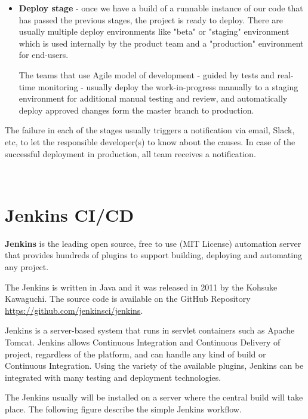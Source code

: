 \documentclass[12pt,a4paper,twoside]{article}
\begin{document}
\begin{itemize}
	\item \textbf{Deploy stage} - once we have a build of a runnable instance of our code that has passed the previous stages, the project is ready to deploy. There are usually multiple deploy environments like "beta" or "staging" environment which is used internally by the product team and a "production" environment for end-users.

The teams that use Agile model of development - guided by tests and real-time monitoring - usually deploy the work-in-progress manually to a staging environment for additional manual testing and review, and automatically deploy approved changes form the master branch to production.
\end{itemize}

The failure in each of the stages usually triggers a notification via email, Slack, etc, to let the responsible developer(s) to know about the causes. In case of the successful deployment in production, all team receives a notification.



~\newpage


\section{Jenkins CI/CD}


\textbf{Jenkins} is the leading open source, free to use (MIT License) automation server that provides hundreds of plugins to support building, deploying and automating any project. 

The Jenkins is written in Java and it was released in 2011 by the Kohsuke Kawaguchi. The source code is available on the GitHub Repository \url{https://github.com/jenkinsci/jenkins}.

Jenkins is a server-based system that runs in servlet containers such as Apache Tomcat. Jenkins allows Continuous Integration and Continuous Delivery of project, regardless of the platform, and can handle any kind of build or Continuous Integration. Using the variety of the available plugins, Jenkins can be integrated with many testing and deployment technologies.


The Jenkins usually will be installed on a server where the central build will take place. The following figure describe the simple Jenkins workflow.
\end{document}
